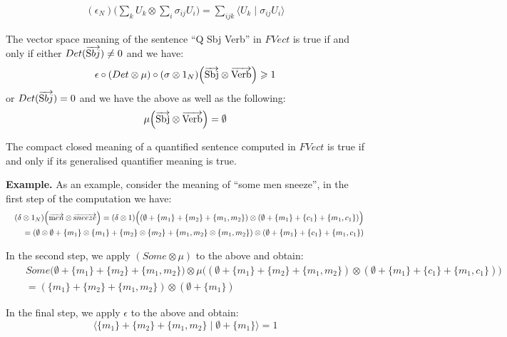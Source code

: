 \begin{align*}
(\epsilon_{N})  \Big(\sum_k U_k \otimes \sum_i \sigma_{ij} {U}_i  \Big) =  \sum_{ijk}  \langle  U_k   \mid  \sigma_{ij} {U}_i \rangle  
\end{align*}

\begin{definition}
\label{deftrue}
The vector space meaning of the sentence ``Q Sbj Verb'' in $FVect$  is true if and only if either $Det(\overrightarrow{\text Sbj}) \neq 0$ and we have: 
\[
\epsilon \circ (Det \otimes \mu) \circ (\sigma \otimes 1_N) \Big(\overrightarrow{\text{Sbj}} \otimes \overrightarrow{\text{Verb}} \Big) \geqslant 1 
\] 
or  $Det(\overrightarrow{\text Sbj}) = 0$ and we have the above as well as the following:
\[
\mu \Big(\overrightarrow{\text{Sbj}} \otimes \overrightarrow{\text{Verb}} \Big) = \emptyset\]
\end{definition}

\begin{proposition}
The  compact closed meaning of a quantified sentence computed in $FVect$  is true if and only if  its generalised quantifier meaning is true.
\end{proposition}

\bigskip
\noindent
{\bf Example.}
As an example,  consider  the  meaning  of  ``some men sneeze'', in the first step of the computation we have:
\begin{eqnarray*}
&&(\delta \otimes 1_N) \Big(\overrightarrow{\text men} \otimes \overrightarrow{\text sneeze}\Big) = (\delta \otimes 1) \Big((\emptyset + \{m_1\} + \{m_2\} + \{m_1, m_2\}) \otimes (\emptyset + \{m_1\} + \{c_1\} + \{m_1, c_1\}) \Big)\\
&&=  (\emptyset \otimes \emptyset + \{m_1\} \otimes \{m_1\} + \{m_2\} \otimes \{m_2\} + \{m_1, m_2\} \otimes \{m_1, m_2\}) \otimes (\emptyset + \{m_1\} + \{c_1\} + \{m_1, c_1\})
\end{eqnarray*}

\noindent
In the second step, we apply $(Some \otimes \mu)$ to the above and obtain:
\begin{eqnarray*}
&& Some\Big(\emptyset + \{m_1\} + \{m_2\} + \{m_1, m_2\}\Big) \otimes \mu \Big((\emptyset  + \{m_1\}  + \{m_2\}  + \{m_1, m_2\}) \otimes (\emptyset + \{m_1\} + \{c_1\} + \{m_1, c_1\})\Big) \\
&&= (\{m_1\} + \{m_2\} + \{m_1, m_2\}) \otimes (\emptyset + \{m_1\})
\end{eqnarray*}

\noindent
In the final step, we apply $\epsilon$ to the above and obtain:
\[
\langle \{m_1\} + \{m_2\} + \{m_1, m_2\} \mid \emptyset + \{m_1\} \rangle =  1
\]

